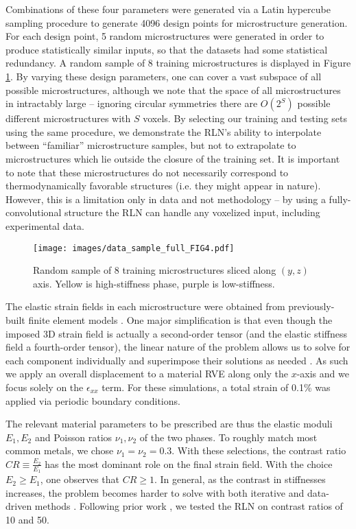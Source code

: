 \documentclass[3p, preprint]{elsarticle}
\newenvironment{revision} {} {}
\begin{document}
Combinations of these four parameters were generated via a Latin hypercube sampling procedure to generate 4096 design points for microstructure generation. For each design point, 5 random microstructures were generated in order to produce statistically similar inputs, so that the datasets had some statistical redundancy. A random sample of 8 training microstructures is displayed in Figure \ref{fig:micro_sample}.  
\begin{revision}
By varying these design parameters, one can cover a vast subspace of all possible microstructures, although we note that the space of all microstructures in intractably large -- ignoring circular symmetries there are $O(2^S)$ possible different microstructures with $S$ voxels. By selecting our training and testing sets using the same procedure, we demonstrate the RLN's ability to interpolate between ``familiar'' microstructure samples, but not to extrapolate to microstructures which lie outside the closure of the training set.\end{revision}
It is important to note that these microstructures do not necessarily correspond to thermodynamically favorable structures (i.e. they might appear in nature). However, this is a limitation only in data and not methodology -- by using a fully-convolutional structure \cite{long2015fully} the RLN can handle any voxelized input, including experimental data. 

\begin{figure}
    \centering
    \texttt{[image: images/data\_sample\_full\_FIG4.pdf]}
    \caption{Random sample of 8 training microstructures sliced along $(y,z)$ axis. Yellow is high-stiffness phase, purple is low-stiffness.}
    \label{fig:micro_sample}
\end{figure}

The elastic strain fields in each microstructure were obtained from previously-built finite element models \cite{yang2019}. One major simplification is that even though the imposed 3D strain field is actually a second-order tensor (and the elastic stiffness field a fourth-order tensor), the linear nature of the problem allows us to solve for each component individually and superimpose their solutions as needed \cite{landi2010}. As such we apply an overall displacement to a material RVE along only the $x$-axis and we focus solely on the $\epsilon_{xx}$ term. For these simulations, a total strain of 0.1\% was applied via periodic boundary conditions. 

The relevant material parameters to be prescribed are thus the elastic moduli $E_1, E_2$ and Poisson ratios $\nu_1, \nu_2$ of the two phases. To roughly match most common metals, we chose $\nu_1 = \nu_2 = 0.3$. With these selections, the contrast ratio $CR \equiv \frac{E_2}{E_1}$ has the most dominant role on the final strain field. With the choice $E_2 \geq E_1$, one observes that $CR \geq 1$. In general, as the contrast in stiffnesses increases, the problem becomes harder to solve with both iterative and data-driven methods \cite{lebensohn2020}. Following prior work \cite{yang2019}, we tested the RLN on contrast ratios of 10 and 50. 
\end{document}
